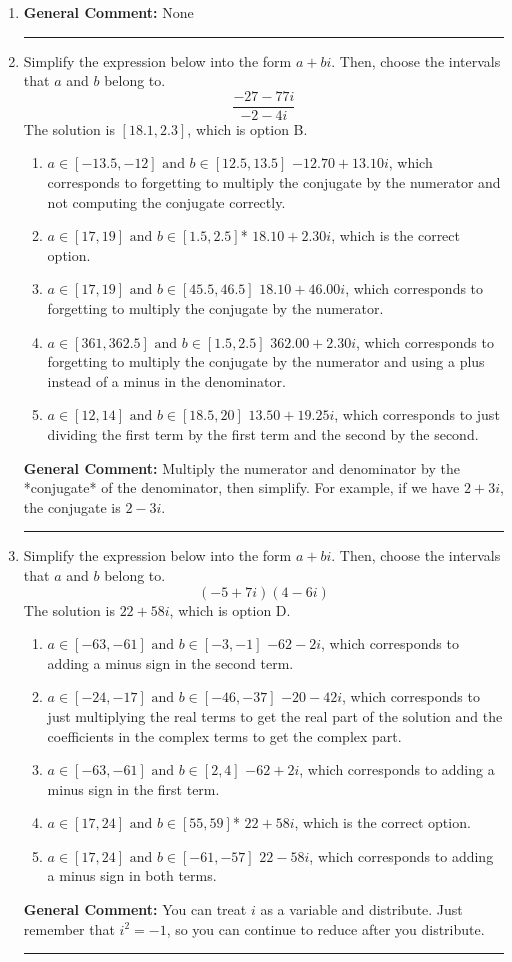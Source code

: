 \documentclass{extbook}[14pt]
\newcommand{\litem}[1]{\item#1\hspace*{-1cm}\rule{\textwidth}{0.4pt}}
\begin{document}
\begin{enumerate}\litem{



\textbf{General Comment:} None
}
\litem{
Simplify the expression below into the form $a+bi$. Then, choose the intervals that $a$ and $b$ belong to.
\[ \frac{-27 - 77 i}{-2 - 4 i} \]
The solution is \( [18.1, 2.3] \), which is option B.\begin{enumerate}[label=\Alph*.]
\item \( a \in [-13.5, -12] \text{ and } b \in [12.5, 13.5] \) $-12.70  + 13.10 i$, which corresponds to forgetting to multiply the conjugate by the numerator and not computing the conjugate correctly.
\item \( a \in [17, 19] \text{ and } b \in [1.5, 2.5] \)* $18.10  + 2.30 i$, which is the correct option.
\item \( a \in [17, 19] \text{ and } b \in [45.5, 46.5] \) $18.10  + 46.00 i$, which corresponds to forgetting to multiply the conjugate by the numerator.
\item \( a \in [361, 362.5] \text{ and } b \in [1.5, 2.5] \) $362.00  + 2.30 i$, which corresponds to forgetting to multiply the conjugate by the numerator and using a plus instead of a minus in the denominator.
\item \( a \in [12, 14] \text{ and } b \in [18.5, 20] \) $13.50  + 19.25 i$, which corresponds to just dividing the first term by the first term and the second by the second.
\end{enumerate}

\textbf{General Comment:} Multiply the numerator and denominator by the *conjugate* of the denominator, then simplify. For example, if we have $2+3i$, the conjugate is $2-3i$.
}
\litem{
Simplify the expression below into the form $a+bi$. Then, choose the intervals that $a$ and $b$ belong to.
\[ (-5 + 7 i)(4 - 6 i) \]
The solution is \( 22 + 58 i \), which is option D.\begin{enumerate}[label=\Alph*.]
\item \( a \in [-63, -61] \text{ and } b \in [-3, -1] \) $-62 - 2 i$, which corresponds to adding a minus sign in the second term.
\item \( a \in [-24, -17] \text{ and } b \in [-46, -37] \) $-20 - 42 i$, which corresponds to just multiplying the real terms to get the real part of the solution and the coefficients in the complex terms to get the complex part.
\item \( a \in [-63, -61] \text{ and } b \in [2, 4] \) $-62 + 2 i$, which corresponds to adding a minus sign in the first term.
\item \( a \in [17, 24] \text{ and } b \in [55, 59] \)* $22 + 58 i$, which is the correct option.
\item \( a \in [17, 24] \text{ and } b \in [-61, -57] \) $22 - 58 i$, which corresponds to adding a minus sign in both terms.
\end{enumerate}

\textbf{General Comment:} You can treat $i$ as a variable and distribute. Just remember that $i^2=-1$, so you can continue to reduce after you distribute.
}
\end{enumerate}
\end{document}
